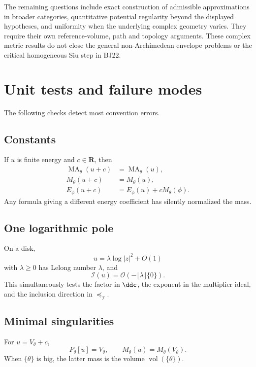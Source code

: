 The remaining questions include exact construction of admissible
approximations in broader categories, quantitative potential
regularity beyond the displayed hypotheses, and uniformity when
the underlying complex geometry varies. They require their own
reference-volume, path and topology arguments. These complex
metric results do not close the general non-Archimedean envelope
problems or the critical homogeneous Siu step in BJ22.


\section{Unit tests and failure modes}
\label{sec:appH-unit-tests}

The following checks detect most convention errors.

\subsection*{Constants}
\label{sec:appH-constants}

If \(u\) is finite energy and \(c\in\mathbf R\), then
\[
\begin{aligned}
 \operatorname{MA}_\theta(u+c)&=\operatorname{MA}_\theta(u),\\
 M_\theta(u+c)&=M_\theta(u),\\
 E_\phi(u+c)&=E_\phi(u)+cM_\theta(\phi).
\end{aligned}
\]
Any formula giving a different energy coefficient has silently normalized
the mass.

\subsection*{One logarithmic pole}
\label{sec:appH-one-pole}

On a disk,
\[
                         u=\lambda\log|z|^2+O(1)
\]
with \(\lambda\geq0\) has Lelong number \(\lambda\), and
\[
                         \mathcal I(u)
          =\mathcal O(-\lfloor\lambda\rfloor\{0\}).
\]
This simultaneously tests the factor in \(\ddc\), the exponent in the
multiplier ideal, and the inclusion direction in
\(\preceq_{\mathcal I}\).

\subsection*{Minimal singularities}
\label{sec:appH-minimal-type}

For \(u=V_\theta+c\),
\[
 P_\theta[u]=V_\theta,\qquad
 M_\theta(u)=M_\theta(V_\theta).
\]
When \(\{\theta\}\) is big, the latter mass is the volume
\(\operatorname{vol}(\{\theta\})\).

